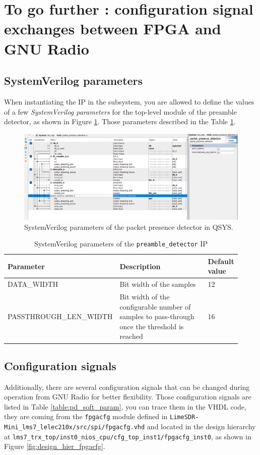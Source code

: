\section{To go further : configuration signal exchanges between FPGA and GNU Radio}

\subsection{SystemVerilog parameters}
When instantiating the IP in the subsystem, you are allowed to define the values of a few \textit{SystemVerilog parameters} for the top-level module of the preamble detector, as shown in Figure \ref{fig:pd_hard_param}. Those parameters described in the Table \ref{table:pd_hard_param}.

\begin{figure}[!h]
    \centering
    \includegraphics[width=\linewidth]{figures/ppd_detect_qsys_config.PNG}
    \caption{SystemVerilog parameters of the packet presence detector in QSYS.}
    \label{fig:pd_hard_param}
\end{figure}

\begin{table}[!h]
\centering
\begin{tabular}{|p{0.36\linewidth}|p{0.48\linewidth}|p{0.08\linewidth}|}
\hline
Parameter & Description & Default value \\
\hline
\textsc{DATA\_WIDTH} & Bit width of the samples & 12 \\
\hline
\textsc{PASSTHROUGH\_LEN\_WIDTH} & Bit width of the configurable number of samples to pass-through once the threshold is reached & 16 \\
\hline
\end{tabular}
\caption{SystemVerilog parameters of the \texttt{preamble\_detector} IP}
\label{table:pd_hard_param}
\end{table}

\subsection{Configuration signals}
\begin{sloppypar}
Additionally, there are several configuration signals that can be changed during operation from GNU Radio for better flexibility. Those configuration signals are listed in Table \ref{table:pd_soft_param}, you can trace them in the VHDL code, they are coming from the \texttt{fpgacfg} module defined in \texttt{LimeSDR-Mini\_lms7\_lelec210x/src/spi/fpgacfg.vhd} and located in the design hierarchy at \texttt{lms7\_trx\_top/inst0\_nios\_cpu/cfg\_top\_inst1/fpgacfg\_inst0}, as shown in Figure \ref{fig:design_hier_fpgacfg}.
\end{sloppypar}

